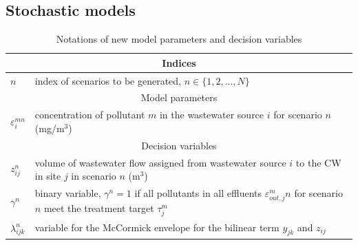 \documentclass[preprint,12pt,authoryear]{elsarticle}
\begin{document}
\pagebreak
\subsection{Stochastic models}\label{stomodels}

\begin{table}[!htpb]
	\setlength{\extrarowheight}{1.5mm}
	\caption{Notations of new model parameters and decision variables}
	\begin{tabular}{|p{1.5cm} p{16cm}|}
		\hline
		\multicolumn{2}{|c|}{Indices} \\
		\hline
		$n$ & index of scenarios to be generated, $n\in\{1,2,...,N\}$\\
		\hline
		\multicolumn{2}{|c|}{Model parameters} \\
		\hline
		$\varepsilon_i^{mn}$ & concentration of pollutant $m$ in the wastewater source $i$ for scenario $n$ (mg/m$^3$)\\
		\hline
		\multicolumn{2}{|c|}{Decision variables}\\
		\hline	
		$z_{ij}^n$ & volume of wastewater flow assigned from wastewater source $i$ to the CW in site $j$ in scenario $n$  (m$^3$)\\
		$\gamma^n$ & binary variable, $\gamma^n = 1$ if all pollutants in all effluents $\varepsilon_{out,j}^mn$ for scenario $n$ meet the treatment target $\tau_j^m$\\
		$\lambda_{ijk}^n$ & variable for the McCormick envelope for the bilinear term $y_{jk}$ and $z_{ij}$\\ 
		\hline	
	\end{tabular}

	\label{table:modelparameters1}
\end{table}
\pagebreak
\end{document}
